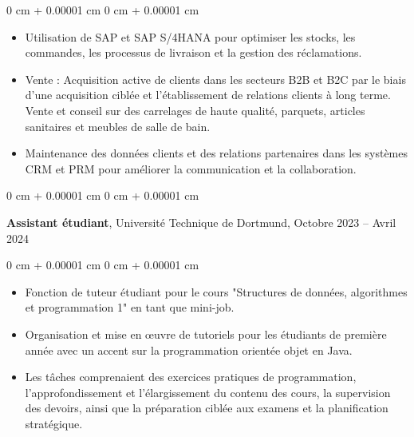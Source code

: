 \documentclass[10pt, letterpaper]{article}
\newenvironment{highlights}{
    \begin{itemize}[
        topsep=0.10 cm,
        parsep=0.10 cm,
        partopsep=0pt,
        itemsep=0pt,
        leftmargin=0 cm + 10pt
    ]
}{
    \end{itemize}
} %
\newenvironment{onecolentry}{
    \begin{adjustwidth}{
        0 cm + 0.00001 cm
    }{
        0 cm + 0.00001 cm
    }
}{
    \end{adjustwidth}
} %
\newenvironment{twocolentry}[2][]{
    \onecolentry
    \def\secondColumn{#2}
    \setcolumnwidth{\fill, 4.5 cm}
    \begin{paracol}{2}
}{
    \switchcolumn \raggedleft \secondColumn
    \end{paracol}
    \endonecolentry
} %
\begin{document}
        \vspace{0.10 cm}
        \begin{onecolentry}
            \begin{highlights}
                \item Utilisation de SAP et SAP S/4HANA pour optimiser les stocks, les commandes, les processus de livraison et la gestion des réclamations.

               \item Vente : Acquisition active de clients dans les secteurs B2B et B2C par le biais d'une acquisition ciblée et l'établissement de relations clients à long terme. Vente et conseil sur des carrelages de haute qualité, parquets, articles sanitaires et meubles de salle de bain.




                \item Maintenance des données clients et des relations partenaires dans les systèmes CRM et PRM pour améliorer la communication et la collaboration.

               
                 


               
            \end{highlights}
        \end{onecolentry}


        \vspace{1 cm}
 
        \begin{twocolentry}{
            Octobre 2023 – Avril 2024
        }
            \textbf{Assistant étudiant}, Université Technique de Dortmund, \end{twocolentry}

       \vspace{0.10 cm}
\begin{onecolentry}
    \begin{highlights}
        \item Fonction de tuteur étudiant pour le cours "Structures de données, algorithmes et programmation 1" en tant que mini-job.
        \item Organisation et mise en œuvre de tutoriels pour les étudiants de première année avec un accent sur la programmation orientée objet en Java.
        \item Les tâches comprenaient des exercices pratiques de programmation, l'approfondissement et l'élargissement du contenu des cours, la supervision des devoirs, ainsi que la préparation ciblée aux examens et la planification stratégique.
       
    \end{highlights}
\end{onecolentry}
\end{document}
